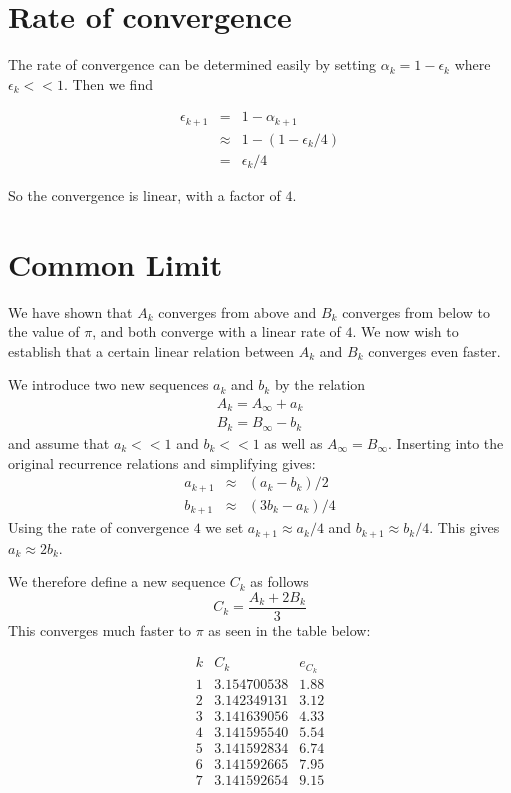 \documentclass[12pt,oneside,a4paper]{article}
\begin{document}
\section{Rate of convergence}
The rate of convergence can be determined easily by setting $\alpha_k = 1 - \epsilon_k$ where $\epsilon_k << 1$. Then we
find

\begin{eqnarray*}
    \epsilon_{k+1} &=& 1 - \alpha_{k+1} \\
    &\approx& 1 - (1 - \epsilon_k/4) \\
    &=& \epsilon_k/4
\end{eqnarray*}

So the convergence is linear, with a factor of $4$.

\section{Common Limit}
We have shown that $A_k$ converges from above and $B_k$ converges from below to the value of $\pi$, and both converge
with a linear rate of $4$.
We now wish to establish that a certain linear relation between $A_k$ and $B_k$ converges even faster.

We introduce two new sequences $a_k$ and $b_k$ by the relation
\begin{eqnarray*}
    A_k = A_\infty + a_k \\
    B_k = B_\infty - b_k
\end{eqnarray*}
and assume that $a_k << 1$ and $b_k << 1$ as well as $A_\infty = B_\infty$.
Inserting into the original recurrence relations and simplifying gives:
\begin{eqnarray*}
    a_{k+1} &\approx& (a_k - b_k)/2 \\
    b_{k+1} &\approx& (3b_k - a_k)/4
\end{eqnarray*}
Using the rate of convergence $4$ we set $a_{k+1} \approx a_k / 4$ and $b_{k+1} \approx b_k / 4$.
This gives $a_k \approx 2 b_k$.

We therefore define a new sequence $C_k$ as follows
$$
C_k = \frac{A_k + 2B_k}{3}
$$
This converges much faster to $\pi$  as seen in the table below:

$$
\begin{array}{r|c|l|l|l|l}
    k & C_k & e_{C_k}\\ \hline
    1 & 3.154700538 & 1.88 \\ \hline
    2 & 3.142349131 & 3.12 \\ \hline
    3 & 3.141639056 & 4.33 \\ \hline
    4 & 3.141595540 & 5.54 \\ \hline
    5 & 3.141592834 & 6.74 \\ \hline
    6 & 3.141592665 & 7.95 \\ \hline
    7 & 3.141592654 & 9.15
\end{array}
$$
\end{document}
